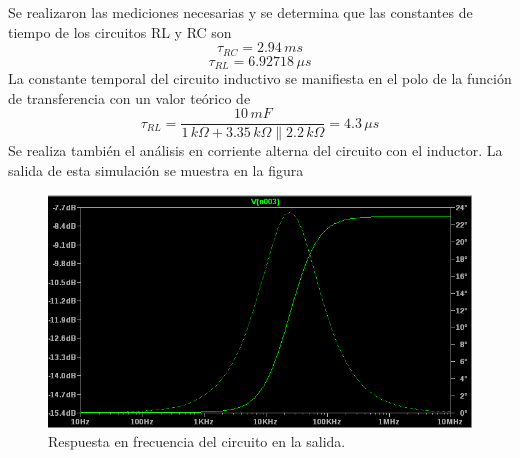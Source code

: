 \documentclass[letterpaper,11pt]{article}
\newcommand{\unidad}[1]{\,\si{#1}}
\begin{document}
		Se realizaron las mediciones necesarias y se determina que las constantes de tiempo de los circuitos RL y RC son
		\[ \tau_{RC} = 2.94 \unidad{ms} \]
		\[ \tau_{RL} = 6.92718\unidad{\mu s}\]
		La constante temporal del circuito inductivo se manifiesta en el polo de la función de transferencia con un valor teórico de 
		\[ \tau_{RL} = \frac{10\unidad{mF}}{1\unidad{k \Omega} + 3.35 \unidad{k\Omega} \parallel 2.2 \unidad{k \Omega}} =  4.3 \unidad{\mu s}\]
		Se realiza también el análisis en corriente alterna del circuito con el inductor.
		La salida de esta simulación se muestra en la figura 
		\begin{figure}[h!]
			\centering
			\includegraphics[width=0.7\linewidth]{rl_ac_anal}
			\caption{Respuesta en frecuencia del circuito en la salida.}
			\label{fig:rl_ac_anal}
		\end{figure}
		\FloatBarrier
\end{document}
